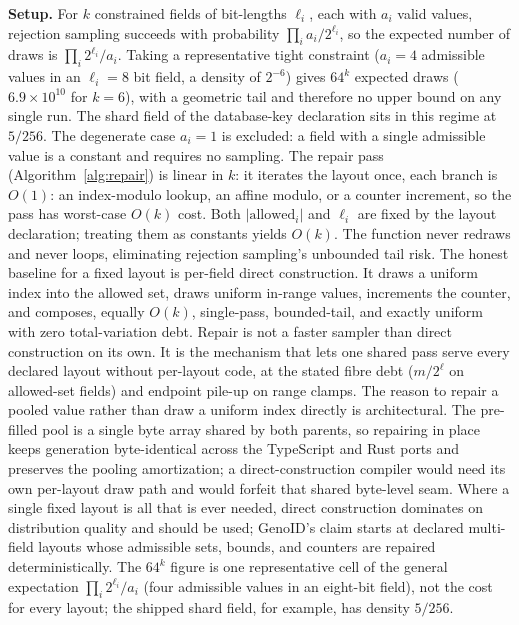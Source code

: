 \documentclass{svproc}
\begin{document}
\textbf{Setup.} For $k$ constrained fields of bit-lengths $\ell_i$, each with $a_i$ valid values, rejection sampling succeeds with probability $\prod_i a_i / 2^{\ell_i}$, so the expected number of draws is $\prod_i 2^{\ell_i}/a_i$. Taking a representative tight constraint ($a_i=4$ admissible values in an $\ell_i=8$ bit field, a density of $2^{-6}$) gives $64^k$ expected draws ($6.9\times10^{10}$ for $k=6$), with a geometric tail and therefore no upper bound on any single run. The shard field of the database-key declaration sits in this regime at $5/256$. The degenerate case $a_i=1$ is excluded: a field with a single admissible value is a constant and requires no sampling. The repair pass (Algorithm~\ref{alg:repair}) is linear in $k$: it iterates the layout once, each branch is $O(1)$: an index-modulo lookup, an affine modulo, or a counter increment, so the pass has worst-case $O(k)$ cost. Both $|\text{allowed}_i|$ and $\ell_i$ are fixed by the layout declaration; treating them as constants yields $O(k)$. The function never redraws and never loops, eliminating rejection sampling's unbounded tail risk. The honest baseline for a fixed layout is per-field direct construction. It draws a uniform index into the allowed set, draws uniform in-range values, increments the counter, and composes, equally $O(k)$, single-pass, bounded-tail, and exactly uniform with zero total-variation debt. Repair is not a faster sampler than direct construction on its own. It is the mechanism that lets one shared pass serve every declared layout without per-layout code, at the stated fibre debt ($m/2^\ell$ on allowed-set fields) and endpoint pile-up on range clamps. The reason to repair a pooled value rather than draw a uniform index directly is architectural. The pre-filled pool is a single byte array shared by both parents, so repairing in place keeps generation byte-identical across the TypeScript and Rust ports and preserves the pooling amortization; a direct-construction compiler would need its own per-layout draw path and would forfeit that shared byte-level seam. Where a single fixed layout is all that is ever needed, direct construction dominates on distribution quality and should be used; GenoID's claim starts at declared multi-field layouts whose admissible sets, bounds, and counters are repaired deterministically. The $64^k$ figure is one representative cell of the general expectation $\prod_i 2^{\ell_i}/a_i$ (four admissible values in an eight-bit field), not the cost for every layout; the shipped shard field, for example, has density $5/256$.
\end{document}
